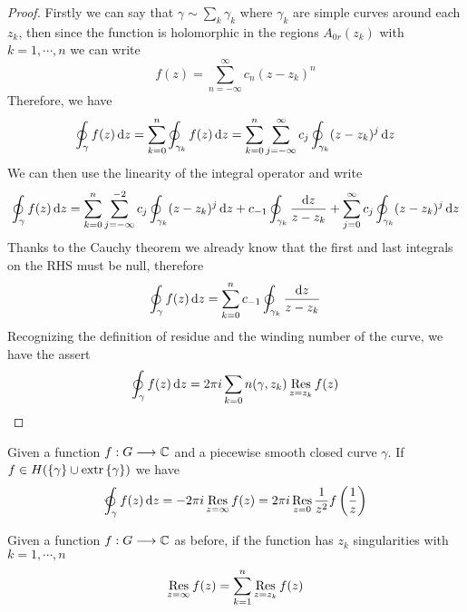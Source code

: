\documentclass[../complete.tex]{subfiles}
\begin{document}
\begin{proof}
	Firstly we can say that $\gamma\sim\sum_k\gamma_k$ where $\gamma_k$ are simple curves around each $z_k$, then since the function is holomorphic in the regions $A_{0r}(z_k)$ with $k=1,\cdots,n$ we can write
	\begin{equation*}
		f(z)=\sum_{n=-\infty}^{\infty}c_n(z-z_k)^n
	\end{equation*}
	Therefore, we have
	\begin{equation*}
		\oint_\gamma f(z)\operatorname{d\!} z=\sum_{k=0}^{n}\oint_{\gamma_k}f(z)\operatorname{d\!} z=\sum_{k=0}^n\sum_{j=-\infty}^\infty c_j\oint_{\gamma_k}(z-z_k)^j\operatorname{d\!} z
	\end{equation*}
	We can then use the linearity of the integral operator and write
	\begin{equation*}
		\oint_\gamma f(z)\operatorname{d\!} z=\sum_{k=0}^n\sum_{j=-\infty}^{-2}c_{j}\oint_{\gamma_k}(z-z_k)^j\operatorname{d\!} z+c_{-1}\oint_{\gamma_k}\frac{\operatorname{d\!} z}{z-z_k}+\sum_{j=0}^\infty c_j\oint_{\gamma_k}(z-z_k)^j\operatorname{d\!} z
	\end{equation*}
	Thanks to the Cauchy theorem we already know that the first and last integrals on the RHS must be null, therefore
	\begin{equation*}
		\oint_\gamma f(z)\operatorname{d\!} z=\sum_{k=0}^nc_{-1}\oint_{\gamma_k}\frac{\operatorname{d\!} z}{z-z_k}
	\end{equation*}
	Recognizing the definition of residue and the winding number of the curve, we have the assert
	\begin{equation*}
		\oint_\gamma f(z)\operatorname{d\!} z=2\pi i\sum_{k=0}n(\gamma,z_k)\operatorname*{\mathrm{Res}}_{z=z_k}f(z)
	\end{equation*}
\end{proof}
\begin{dfn}
	Given a function $f:G\overset{}{\longrightarrow}\mathbb{C}$ and a piecewise smooth closed curve $\gamma$. If $f\in H(\{\gamma\}\cup\operatorname{extr}{\{\gamma\}})$ we have
	\begin{equation}
		\ointccw_\gamma f(z)\diff z=-2\pi i\res_{z=\infty}f(z)=2\pi i\res_{z=0}\frac{1}{z^2}f\left( \frac{1}{z} \right)
		\label{eq:infresidue}
	\end{equation}
\end{dfn}
\begin{thm}
	Given a function $f:G\overset{}{\longrightarrow}\mathbb{C}$ as before, if the function has $z_k$ singularities with $k=1,\cdots,n$
	\begin{equation}
		\operatorname*{\mathrm{Res}}_{z=\infty}f(z)=\sum_{k=1}^n\operatorname*{\mathrm{Res}}_{z=z_k}f(z)
		\label{eq:residueformula}
	\end{equation}
\end{thm}
\end{document}
